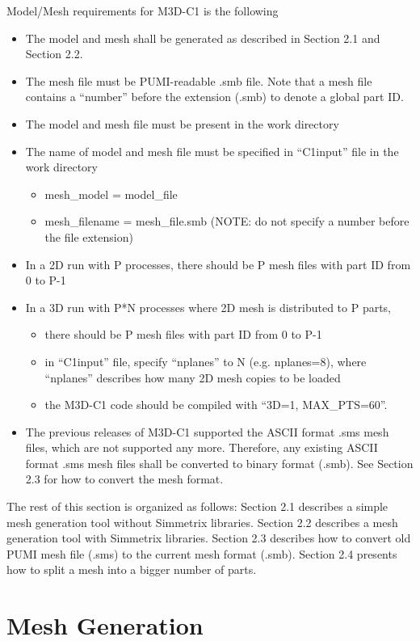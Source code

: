 Model/Mesh requirements for M3D-C1 is the following
\begin{itemize}
\item	The model and mesh shall be generated as described in Section 2.1 and Section 2.2.
\item	The mesh file must be PUMI-readable .smb file. Note that a mesh file contains a “number” before the extension (.smb) to denote a global part ID.
\item	The model and mesh file must be present in the work directory
\item	The name of model and mesh file must be specified in “C1input” file in the work directory
\begin{itemize}
\item	mesh\_model = model\_file
\item	mesh\_filename = mesh\_file.smb (NOTE: do not specify a number before the file extension)
\end{itemize}
\item In a 2D run with P processes, there should be P mesh files with part ID from 0 to P-1
\item	In a 3D run with P*N processes where 2D mesh is distributed to P parts, 
\begin{itemize}
\item	there should be P mesh files with part ID from 0 to P-1
\item	in “C1input” file, specify “nplanes” to N (e.g. nplanes=8), where “nplanes” describes how many 2D mesh copies to be loaded
\item	the M3D-C1 code should be compiled with “3D=1, MAX\_PTS=60”.
\end{itemize}
\item The previous releases of M3D-C1 supported the ASCII format .sms mesh files, which are not supported any more. Therefore, any existing ASCII format .sms mesh files shall be converted to binary format (.smb). See Section 2.3 for how to convert the mesh format.
\end{itemize}

The rest of this section is organized as follows: Section 2.1 describes a simple mesh generation tool without Simmetrix libraries. Section 2.2 describes a mesh generation tool with Simmetrix libraries. Section 2.3 describes how to convert old PUMI mesh file (.sms) to the current mesh format (.smb). Section 2.4 presents how to split a mesh into a bigger number of parts. 


\section{Mesh Generation}
